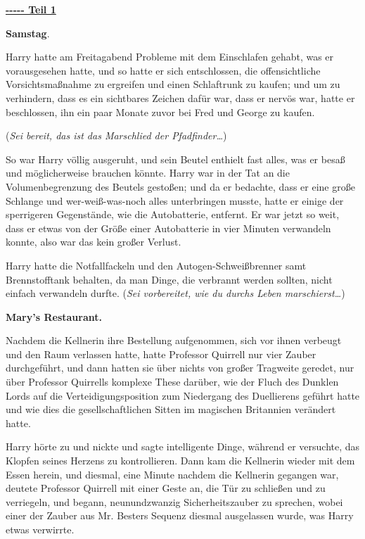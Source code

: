 

\hypertarget{teil-1}{%

\textbf{\uline{-\/-\/-\/-\/- Teil 1}}

\textbf{Samstag}.

Harry hatte am Freitagabend Probleme mit dem Einschlafen gehabt, was er vorausgesehen hatte, und so hatte er sich entschlossen, die offensichtliche Vorsichtsmaßnahme zu ergreifen und einen Schlaftrunk zu kaufen; und um zu verhindern, dass es ein sichtbares Zeichen dafür war, dass er nervös war, hatte er beschlossen, ihn ein paar Monate zuvor bei Fred und George zu kaufen.

(\emph{Sei bereit, das ist das Marschlied der Pfadfinder…})

So war Harry völlig ausgeruht, und sein Beutel enthielt fast alles, was er besaß und möglicherweise brauchen könnte. Harry war in der Tat an die Volumenbegrenzung des Beutels gestoßen; und da er bedachte, dass er eine große Schlange und wer-weiß-was-noch alles unterbringen musste, hatte er einige der sperrigeren Gegenstände, wie die Autobatterie, entfernt. Er war jetzt so weit, dass er etwas von der Größe einer Autobatterie in vier Minuten verwandeln konnte, also war das kein großer Verlust.

Harry hatte die Notfallfackeln und den Autogen-Schweißbrenner samt Brennstofftank behalten, da man Dinge, die verbrannt werden sollten, nicht einfach verwandeln durfte. (\emph{Sei vorbereitet, wie du durchs Leben marschierst…})

\textbf{Mary's Restaurant.}

Nachdem die Kellnerin ihre Bestellung aufgenommen, sich vor ihnen verbeugt und den Raum verlassen hatte, hatte Professor Quirrell nur vier Zauber durchgeführt, und dann hatten sie über nichts von großer Tragweite geredet, nur über Professor Quirrells komplexe These darüber, wie der Fluch des Dunklen Lords auf die Verteidigungsposition zum Niedergang des Duellierens geführt hatte und wie dies die gesellschaftlichen Sitten im magischen Britannien verändert hatte.

Harry hörte zu und nickte und sagte intelligente Dinge, während er versuchte, das Klopfen seines Herzens zu kontrollieren. Dann kam die Kellnerin wieder mit dem Essen herein, und diesmal, eine Minute nachdem die Kellnerin gegangen war, deutete Professor Quirrell mit einer Geste an, die Tür zu schließen und zu verriegeln, und begann, neunundzwanzig Sicherheitszauber zu sprechen, wobei einer der Zauber aus Mr. Besters Sequenz diesmal ausgelassen wurde, was Harry etwas verwirrte.

}
